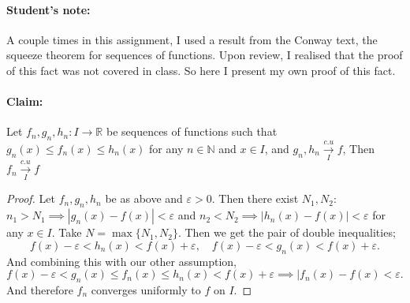 \documentclass{article}
\begin{document}
\paragraph{Student's note:} A couple times in this assignment, I used a result from the Conway text, the squeeze theorem for sequences of functions. Upon review, I realised that the proof of this fact was not covered in class. So here I present my own proof of this fact. 

\paragraph{Claim:} Let  $f_n,g_n,h_n:I\to \mathbb{R}$ be sequences of functions such that $g_n(x)\leq f_n(x)\leq h_n(x)$ for any $n\in \mathbb{N}$ and $x\in I$, and $g_n,h_n\xrightarrow[{I}]{c.u}f$, Then $f_n\xrightarrow[{I}]{c.u}f$
\begin{proof} 
    Let $f_n,g_n,h_n$ be as above and $\varepsilon>0$. Then there exist $N_1,N_2:$ $n_1>N_1\implies |g_n(x)-f(x)|<\varepsilon$ and $n_2<N_2\implies |h_n(x)-f(x)|<\varepsilon$ for any $x\in I $. Take $N=\max \{N_1,N_2\} $. Then we get the pair of double inequalities;
    \[
    f(x)-\varepsilon < h_n(x)<f(x)+\varepsilon,\quad
    f(x)-\varepsilon < g_n(x)<f(x)+\varepsilon
    .\] 
    And combining this with our other assumption,
    \[
    f(x)-\varepsilon <g_n(x)\leq f_n(x)\leq h_n(x)<f(x)+\varepsilon\implies|f_n(x)-f(x)<\varepsilon
    .\] 
    And therefore $f_n$ converges uniformly to $f$ on $I$.
\end{proof}
\end{document}

